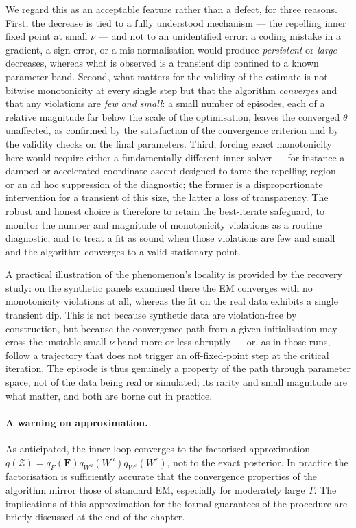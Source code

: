 \documentclass[11pt, a4paper, oneside]{article}
\newcommand{\mF}{\mathbf{F}}
\begin{document}
We regard this as an acceptable feature rather than a defect, for
three reasons. First, the decrease is tied to a fully understood
mechanism --- the repelling inner fixed point at small $\nu$ --- and
not to an unidentified error: a coding mistake in a gradient, a sign
error, or a mis-normalisation would produce \emph{persistent} or
\emph{large} decreases, whereas what is observed is a transient dip
confined to a known parameter band. Second, what matters for the
validity of the estimate is not bitwise monotonicity at every single
step but that the algorithm \emph{converges} and that any violations
are \emph{few and small}: a small number of episodes, each of a
relative magnitude far below the scale of the optimisation, leaves the
converged $\theta$ unaffected, as confirmed by the satisfaction of the
convergence criterion and by the validity checks on the final
parameters. Third, forcing exact monotonicity here would require
either a fundamentally different inner solver --- for instance a
damped or accelerated coordinate ascent designed to tame the repelling
region --- or an ad hoc suppression of the diagnostic; the former is a
disproportionate intervention for a transient of this size, the latter
a loss of transparency. The robust and honest choice is therefore to
retain the best-iterate safeguard, to monitor the number and magnitude
of monotonicity violations as a routine diagnostic, and to treat a fit
as sound when those violations are few and small and the algorithm
converges to a valid stationary point.

A practical illustration of the phenomenon's locality is provided by
the recovery study: on the synthetic panels examined there the EM converges with no
monotonicity violations at all, whereas the fit on the real data
exhibits a single transient dip. This is not because synthetic data
are violation-free by construction, but because the convergence path
from a given initialisation may cross the unstable small-$\nu$ band
more or less abruptly --- or, as in those runs, follow a trajectory
that does not trigger an off-fixed-point step at the critical
iteration. The episode is thus genuinely a property of the path
through parameter space, not of the data being real or simulated;
its rarity and small magnitude are what matter, and both are borne
out in practice.

\paragraph{A warning on approximation.}
As anticipated, the inner loop converges to the factorised
approximation $q(\mathcal{Z}) = q_F(\mF) q_{W^u}(W^u) q_{W^\varepsilon}(W^\varepsilon)$,
not to the exact posterior. In practice the factorisation is
sufficiently accurate that the convergence properties of the algorithm
mirror those of standard EM, especially for moderately large $T$. The
implications of this approximation for the formal guarantees of the
procedure are briefly discussed at the end of the chapter.
\end{document}
